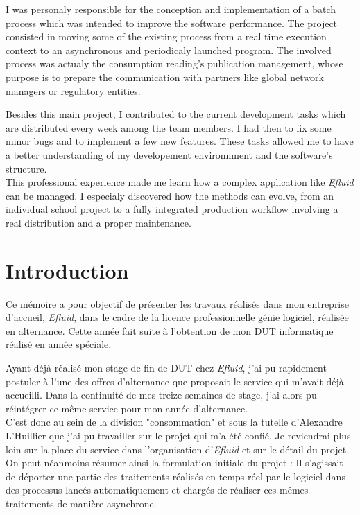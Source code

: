 \documentclass[a4paper, 12pt]{report}
\begin{document}
I was personaly responsible for the conception and implementation of a batch process which was intended to improve the software performance. The project consisted in moving some of the existing process from a real time execution context to an asynchronous and periodicaly launched program. The involved process was actualy the consumption reading's publication management, whose purpose is to prepare the communication with partners like global network managers or regulatory entities.

Besides this main project, I contributed to the current development tasks which are distributed every week among the team members. I had then to fix some minor bugs and to implement a few new features. These tasks allowed me to have a better understanding of my developement environnment and the software's structure.\\

This professional experience made me learn how a complex application like \textit{Efluid} can be managed. I especialy discovered how the methods can evolve, from an individual school project to a fully integrated production workflow involving a real distribution and a proper maintenance.

\chapter*{Introduction}

Ce mémoire a pour objectif de présenter les travaux réalisés dans mon entreprise d'accueil, \textit{Efluid}, dans le cadre de la licence professionnelle génie logiciel, réalisée en alternance. Cette année fait suite à l'obtention de mon DUT informatique réalisé en année spéciale.

Ayant déjà réalisé mon stage de fin de DUT chez \textit{Efluid}, j'ai pu rapidement postuler à l'une des offres d'alternance que proposait le service qui m'avait déjà accueilli. Dans la continuité de mes treize semaines de stage, j'ai alors pu réintégrer ce même service pour mon année d'alternance.\\

C'est donc au sein de la division "consommation" et sous la tutelle d'Alexandre L'Huillier que j'ai pu travailler sur le projet qui m'a été confié. Je reviendrai plus loin sur la place du service dans l'organisation d'\textit{Efluid} et sur le détail du projet. On peut néanmoins résumer ainsi la formulation initiale du projet : Il s'agissait de déporter une partie des traitements réalisés en temps réel par le logiciel dans des processus lancés automatiquement et chargés de réaliser ces mêmes traitements de manière asynchrone.
\end{document}
